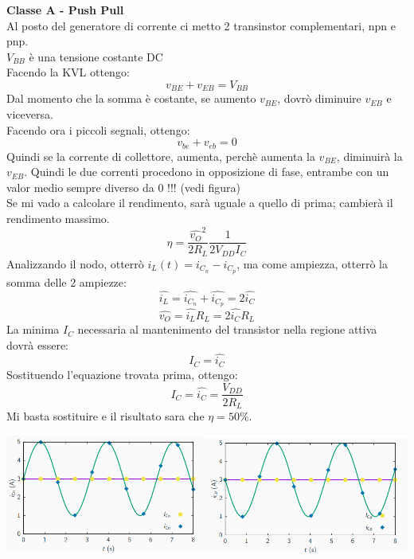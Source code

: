 \documentclass{article}
\begin{document}
\textbf{Classe A - Push Pull}\\
Al posto del generatore di corrente ci metto 2 transinstor complementari, npn e pnp.\\
$V_{BB}$ è una tensione costante DC \\
Facendo la KVL ottengo:\\
\begin{equation}
    v_{BE}+v_{EB}=V_{BB}
\end{equation}
Dal momento che la somma è costante, se aumento $v_{BE}$, dovrò diminuire $v_{EB}$ e viceversa.\\
Facendo ora i piccoli segnali, ottengo: \\
\begin{equation}
    v_{be}+v_{eb}=0
\end{equation}
Quindi se la corrente di collettore, aumenta, perchè aumenta la $v_{BE}$, diminuirà la $v_{EB}$. Quindi le due correnti procedono in opposizione di fase, entrambe con un valor medio sempre diverso da 0 !!! (vedi figura)\\
Se mi vado a calcolare il rendimento, sarà uguale a quello di prima; cambierà il rendimento massimo.\\
\begin{equation}
    \eta=\frac{\hat{v_{O}}^2}{2R_{L}}\frac{1}{2V_{DD}I_{C}}
\end{equation}
Analizzando il nodo, otterrò $i_{L}(t)=i_{C_{n}}-i_{C_{p}}$, ma come ampiezza, otterrò la somma delle 2 ampiezze: 
\begin{equation}
    \hat{i_{L}}=\hat{i_{C_{n}}}+\hat{i_{C_{p}}}=2\hat{i_{C}}
\end{equation}
\begin{equation}
    \hat{v_{O}}=\hat{i_{L}}R_{L}=2\hat{i_{C}}R_{L}
\end{equation}
La minima $I_{C}$ necessaria al mantenimento del transistor nella regione attiva dovrà essere:
\begin{equation}
    I_{C}=\hat{i_{C}}
\end{equation}
Sostituendo l'equazione trovata prima, ottengo:
\begin{equation}
    I_{C}=\hat{i_{C}}=\frac{V_{DD}}{2R_{L}}
\end{equation}
Mi basta sostituire e il risultato sara che $ \eta=50\% $.
\begin{center}
    \includegraphics[scale=0.6]{Exit.png}
\end{center}
\end{document}
